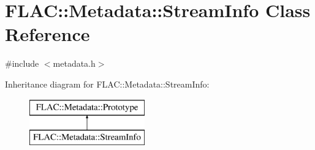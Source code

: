\hypertarget{class_f_l_a_c_1_1_metadata_1_1_stream_info}{}\section{F\+L\+AC\+:\+:Metadata\+:\+:Stream\+Info Class Reference}
\label{class_f_l_a_c_1_1_metadata_1_1_stream_info}


{\ttfamily \#include $<$metadata.\+h$>$}

Inheritance diagram for F\+L\+AC\+:\+:Metadata\+:\+:Stream\+Info\+:\begin{figure}[H]
\begin{center}
\leavevmode
\includegraphics[height=2.000000cm]{class_f_l_a_c_1_1_metadata_1_1_stream_info}
\end{center}
\end{figure}

